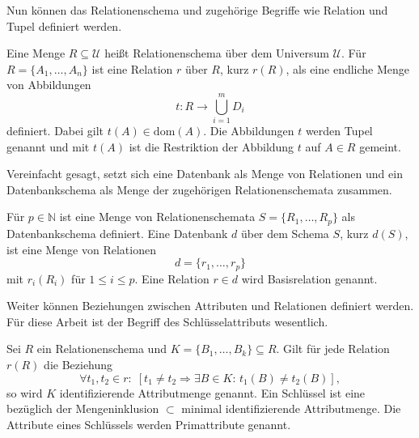 Nun können das Relationenschema und zugehörige Begriffe wie Relation und Tupel definiert werden.

\begin{defi}
    \label{def:relation}
    Eine Menge $R \subseteq \mathcal{U}$ heißt Relationenschema über dem Universum $\mathcal{U}$. Für $R=\{A_1, \ldots, A_n \}$ ist eine Relation $r$ über $R$, kurz $r(R)$, als eine endliche Menge von Abbildungen
    \begin{equation*}
        t:R \rightarrow \bigcup_{i=1}^m D_i
    \end{equation*}
    definiert. Dabei gilt $t(A) \in \mathrm{dom}(A)$. Die Abbildungen $t$ werden Tupel genannt und mit $t(A)$ ist die Restriktion der Abbildung $t$ auf $A \in R$ gemeint.
\end{defi}

Vereinfacht gesagt, setzt sich eine Datenbank als Menge von Relationen und ein Datenbankschema als Menge der zugehörigen Relationenschemata zusammen.

\begin{defi}
    Für $p \in \mathbb{N}$ ist eine Menge von Relationenschemata $S=\{R_1, \ldots, R_p\}$ als Datenbankschema definiert. Eine Datenbank $d$ über dem Schema $S$, kurz $d(S)$, ist eine Menge von Relationen
    \begin{equation*}
        d=\{r_1, \ldots, r_p \}
    \end{equation*}
    mit $r_i(R_i)$ für $1 \leq i \leq p$. Eine Relation $r \in d$ wird Basisrelation genannt.
\end{defi}

Weiter können Beziehungen zwischen Attributen und Relationen definiert werden. Für diese Arbeit ist der Begriff des Schlüsselattributs wesentlich.

\begin{defi}[Schlüssel]
    \label{def:key}
    Sei $R$ ein Relationenschema und $K=\{B_1, \ldots, B_k\} \subseteq R$. Gilt für jede Relation $r(R)$ die Beziehung
    \begin{equation*}
         \forall t_1, t_2 \in r: \; [ t_1 \neq t_2 \Rightarrow \exists B \in K: \, t_1(B) \neq t_2(B)],
    \end{equation*}
    so wird $K$ identifizierende Attributmenge genannt. Ein Schlüssel ist eine bezüglich der Mengeninklusion $\subset$ minimal identifizierende Attributmenge. Die Attribute eines Schlüssels werden Primattribute genannt.
\end{defi}

